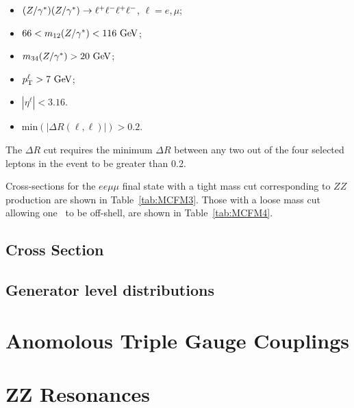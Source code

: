 \begin{itemize}
\item $(Z/\gamma^*)(Z/\gamma^*)\rightarrow\ell^+ \ell^-\ell^+ \ell^-$, $\ell = e,\mu$;
\item $66 < m_{12}(\Z/\gamma^*) <  116\GeV$;
\item $m_{34}(\Z/\gamma^*) > 20\GeV$;
\item $\pT^{\ell} > 7\GeV$;
\item $|\eta^{\ell}| < 3.16$.
\item $\mathrm{min}(|\Delta R(\ell,\ell)|) > 0.2$.
\end{itemize}

The $\Delta R$ cut requires the minimum $\Delta R$ between any two out of the
four selected leptons in the event to be greater than 0.2.

Cross-sections for the $ee\mu\mu$ final state with a tight mass cut corresponding to $ZZ$ production are  shown in Table~\ref{tab:MCFM3}.
Those with a loose mass cut allowing one \Z\ to be off-shell, are shown in Table~\ref{tab:MCFM4}.  
\subsection{Cross Section}
\subsection{Generator level distributions}
\section{Anomolous Triple Gauge Couplings}
\section{ZZ Resonances}
